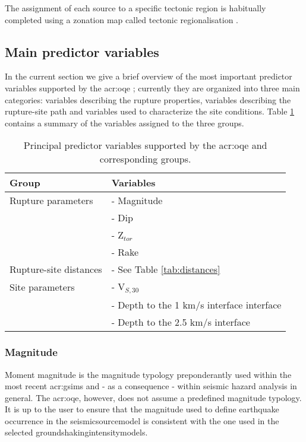 The assignment of each source to a specific tectonic region is habitually 
completed using a zonation map called tectonic regionalisation 
\parencite[see for example][]{delavaud2012}.

%
\subsection{Main predictor variables}
In the current section we give a brief overview of the most 
important predictor variables supported by the \gls{acr:oqe}
\parencite[for general a summary, see][]{akkar2013r}; 
currently they are organized into three main categories: variables 
describing the rupture properties, variables describing the rupture\--site 
path and variables used to characterize the site conditions. 
%
Table \ref{tab:parameters} contains a summary of the variables
assigned to the three groups.
\begin{table}[!h]
\centering
\caption{Principal predictor variables supported by the \gls{acr:oqe} and 
    corresponding groups.}
\begin{tabular}{|p{5cm}p{8cm}|}
\hline
\rowcolor{anti-flashwhite}
\bf{Group} & \bf{Variables} \\
\hline 
Rupture parameters & - Magnitude\\
                   & - Dip \\ 
                   & - Z$_{tor}$ \\ 
                   & - Rake \\ \hline
Rupture-site distances & - See Table \ref{tab:distances} \\ \hline
Site parameters & - V$_{S,30}$ \\
                & - Depth to the 1 km/s interface interface \\
                & - Depth to the 2.5 km/s interface \\ 
\hline
\end{tabular}
\label{tab:parameters}
\end{table}
%
\subsubsection{Magnitude}
Moment magnitude \parencite{hanks1979} is the magnitude typology 
preponderantly used within the most recent \glspl{acr:gsim} and - as a 
consequence - within seismic hazard analysis in general. 
%
The \gls{acr:oqe}, however, does not assume a predefined magnitude typology.
It is up to the user to ensure that the magnitude used to define earthquake 
occurrence in the \gls{seismicsourcemodel} is consistent with the one used 
in the selected \glspl{groundshakingintensitymodel}.

